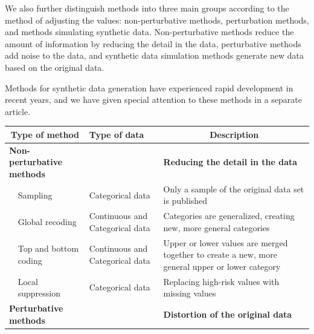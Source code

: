 \documentclass{article}
\begin{document}
We also further distinguish methods into three main groups according to the method of adjusting the values: non-perturbative methods, perturbation methods, and methods simulating synthetic data. 
Non-perturbative methods reduce the amount of information by reducing the detail in the data, perturbative methods add noise to the data, and synthetic data simulation methods generate new data based on the original data. 

Methods for synthetic data generation have experienced rapid development in recent years, and we have given special attention to these methods in a separate article.

\begin{table}[H]
\centering
\begin{tabular}{|p{4cm}|p{4cm}|p{4cm}|p{6cm}|} %
\hline
\multicolumn{2}{|c|}{Type of method}                               & Type of data                    & \multicolumn{1}{c|}{Description}                                                                                             \\ \hline
\multicolumn{2}{|l|}{\textbf{Non-perturbative methods}}             &                                 & \textbf{Reducing the detail in the data}                                                                                     \\ \hline
\multicolumn{1}{|l|}{} & Sampling              & Categorical data                & Only a sample of the original data set is published                                                                          \\ \cline{2-4} 
\multicolumn{1}{|l|}{} & Global recoding       & Continuous and Categorical data & Categories are generalized, creating new, more general categories                                                \\ \cline{2-4} 
\multicolumn{1}{|l|}{} & Top and bottom coding & Continuous and Categorical data & Upper or lower values are merged together to create a new, more general upper or lower category                        \\ \cline{2-4} 
\multicolumn{1}{|l|}{} & Local suppression     & Categorical data                & Replacing high-risk values with missing values                                                                                    \\ \hline
\multicolumn{2}{|l|}{\textbf{Perturbative methods}}                 &                                 & \textbf{Distortion of the original data}                                                                                     \\ \hline

\end{tabular}
\end{table}
\end{document}
